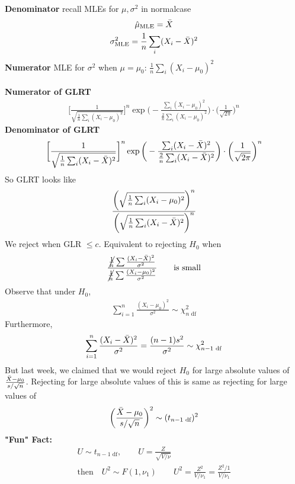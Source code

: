 \textbf{Denominator} recall MLEs for $\mu, \sigma^2$ in normalcase
\begin{gather*}
	\hat{\mu}_{\text{MLE}} = \bar{X}\\
	\sigma^2_{\text{MLE}} = \frac{1}{n}\sum_i (X_i - \bar{X})^2
\end{gather*}
\textbf{Numerator} MLE for $\sigma^2$ when $\mu = \mu_0$: $\frac{1}{n}\sum_i (X_i - \mu_0)^2$\\\\
\textbf{Numerator of GLRT}
\begin{gather*}
	\bigg[ \frac{1}{\sqrt{\frac{1}{n}\sum_i (X_i - \mu_0)^2}} \bigg]^n \exp \bigg(-\frac{\sum_i (X_i - \mu_0)^2}{\frac{2}{n} \sum_i (X_i - \mu_0)^2} \bigg) \cdot \bigg( \frac{1}{\sqrt{2\pi}} \bigg)^n
\end{gather*}
\textbf{Denominator of GLRT}
\begin{gather*}
	\bigg[ \frac{1}{\sqrt{\frac{1}{n}\sum_i (X_i - \bar{X})^2}} \bigg]^n \exp \bigg(-\frac{\sum_i (X_i - \bar{X})^2}{\frac{2}{n} \sum_i (X_i - \bar{X})^2} \bigg) \cdot \bigg( \frac{1}{\sqrt{2\pi}} \bigg)^n
\end{gather*}
So GLRT looks like
\begin{gather*}
	\frac{\bigg( \sqrt{\frac{1}{n}\sum_i (X_i - \mu_0)^2} \bigg)^n}{\bigg( \sqrt{\frac{1}{n}\sum_i (X_i - \bar{X})^2} \bigg)^n}
\end{gather*}
We reject when GLR $\leq c$. Equivalent to rejecting $H_0$ when 
\begin{gather*}
	\frac{\cancel{\frac{1}{n}} \sum \frac{(X_i - \bar{X})^2}{\sigma^2}}{\cancel{\frac{1}{n}} \sum \frac{(X_i - \mu_0)^2}{\sigma^2}} \qquad \text{is small}
\end{gather*}
Observe that under $H_0$, 
\begin{gather*}
	\sum_{i=1}^{n} \frac{(X_i - \mu_0)^2}{\sigma^2} \sim \chi^2_{n \text{ df}}
\end{gather*}
Furthermore,
\begin{gather*}
	\sum_{i=1}^{n} \frac{(X_i - \bar{X})^2}{\sigma^2} = \frac{(n-1)s^2}{\sigma^2} \sim \chi^2_{n-1 \text{ df}}
\end{gather*}
But last week, we claimed that we would reject $H_0$ for large absolute values of $\frac{\bar{X} - \mu_0}{s / \sqrt{n}}$. Rejecting for large absolute values of this is same as rejecting for large values of 
\begin{gather*}
	\bigg( \frac{\bar{X} - \mu_0}{s / \sqrt{n}} \bigg)^2 \sim (t_{n-1 \text{ df}})^2
\end{gather*}
\textbf{"Fun" Fact:}
\begin{gather*}
	U \sim t_{n-1 \text{ df}}, \qquad U = \frac{Z}{\sqrt{V / \nu}} \\
	\text{then} \quad U^2 \sim F(1, \nu_1) \qquad U^2 =  \frac{Z^2}{V / \nu_1}= \frac{Z^2 / 1}{V / \nu_1}
\end{gather*}
